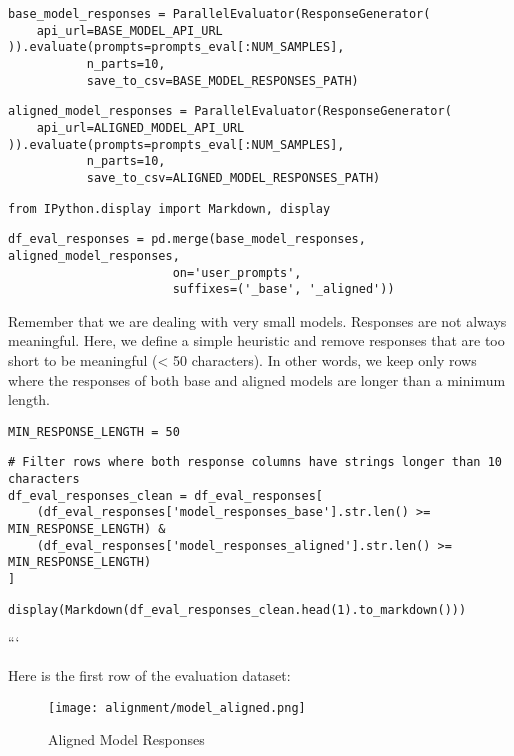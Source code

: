 \begin{verbatim}
base_model_responses = ParallelEvaluator(ResponseGenerator(
    api_url=BASE_MODEL_API_URL
)).evaluate(prompts=prompts_eval[:NUM_SAMPLES],
           n_parts=10,
           save_to_csv=BASE_MODEL_RESPONSES_PATH)
\end{verbatim}

\begin{verbatim}
aligned_model_responses = ParallelEvaluator(ResponseGenerator(
    api_url=ALIGNED_MODEL_API_URL
)).evaluate(prompts=prompts_eval[:NUM_SAMPLES], 
           n_parts=10, 
           save_to_csv=ALIGNED_MODEL_RESPONSES_PATH)
\end{verbatim}

\begin{verbatim}
from IPython.display import Markdown, display  
\end{verbatim}

\begin{verbatim}
df_eval_responses = pd.merge(base_model_responses, aligned_model_responses, 
                       on='user_prompts',
                       suffixes=('_base', '_aligned'))
\end{verbatim}

Remember that we are dealing with very small models. Responses are not always meaningful. Here, we define a simple heuristic and remove responses that are too short to be meaningful (< 50 characters). In other words, we keep only rows where the responses of both base and aligned models are longer than a minimum length.

\begin{verbatim}
MIN_RESPONSE_LENGTH = 50
\end{verbatim}

\begin{verbatim}
# Filter rows where both response columns have strings longer than 10 characters
df_eval_responses_clean = df_eval_responses[
    (df_eval_responses['model_responses_base'].str.len() >= MIN_RESPONSE_LENGTH) & 
    (df_eval_responses['model_responses_aligned'].str.len() >= MIN_RESPONSE_LENGTH)
]
\end{verbatim}

\begin{verbatim}
display(Markdown(df_eval_responses_clean.head(1).to_markdown()))
\end{verbatim}
```

Here is the first row of the evaluation dataset:

\begin{figure}[H]
\centering
\texttt{[image: alignment/model\_aligned.png]}
\caption{Aligned Model Responses}
\label{fig:model-aligned}
\end{figure}



